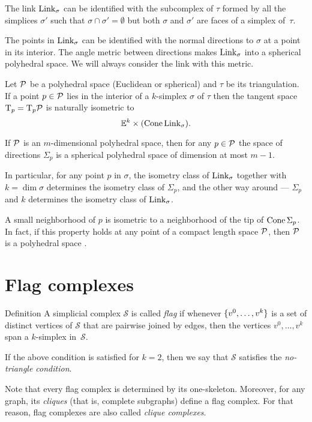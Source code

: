 The link $\mathop{\rm Link}\nolimits_\sigma$
can be identified with the subcomplex of $\tau$ 
formed by all the simplices $\sigma'$ 
such that $\sigma\cap\sigma'=\emptyset$ 
but both $\sigma$ and $\sigma'$ are faces of a simplex of~$\tau$.

The points in $\mathop{\rm Link}\nolimits_\sigma$ can be identified with the normal directions to $\sigma$ at a point in its interior.
The angle metric between directions makes  $\mathop{\rm Link}\nolimits_\sigma$ into a spherical polyhedral space.
We will always consider the link with this metric.

Let $\mathcal{P}$ be a polyhedral space (Euclidean or spherical) and  $\tau$ be its triangulation.
If a point $p\in \mathcal{P}$ 
lies in the interior of a $k$-simplex $\sigma$ of $\tau$ 
then the tangent space $\mathrm{T}_p=\mathrm{T}_p\mathcal{P}$
is  naturally isometric to
\[\mathbb{E}^k\times(\mathop{\rm Cone}\nolimits\mathop{\rm Link}\nolimits_\sigma).\]

If $\mathcal{P}$ is an $m$-dimensional polyhedral space,
then for any $p\in \mathcal{P}$
the space of directions $\Sigma_p$ is a spherical polyhedral space
of dimension at most $m-1$. 

In particular, 
for any point $p$ in $\sigma$,
the isometry class of $\mathop{\rm Link}\nolimits_\sigma$ together with $k=\dim\sigma$
determines the isometry class of $\Sigma_p$, 
 and the other way around --- $\Sigma_p$ and $k$ determines the isometry class of $\mathop{\rm Link}\nolimits_\sigma$.

A small neighborhood of $p$ is isometric to a neighborhood of the tip of $\mathop{\rm Cone}\nolimits\Sigma_p$. 
In fact, if this property holds at any point of a compact length space $\mathcal{P}$,
then  $\mathcal{P}$ is a polyhedral space \cite{lebedeva-petrunin}.

\section{Flag complexes}


\begin{thm}{Definition}\label{def:flag}
A simplicial complex $\mathcal{S}$ 
is called \emph{flag} if whenever $\{v^0,\z\dots,v^k\}$
is a set of distinct vertices of $\mathcal{S}$
that are pairwise joined by edges, then the vertices $v^0,\dots,v^k$
span a $k$-simplex in~$\mathcal{S}$.

If the above condition is satisfied for $k=2$, 
then we say that $\mathcal{S}$ satisfies 
the \emph{no-triangle condition}.
\end{thm}

Note that every flag complex is determined by its one-skeleton.
Moreover, for any graph, its \emph{cliques} (that is, complete subgraphs) define a flag complex.
For that reason, flag complexes are also called  \emph{clique complexes}.

